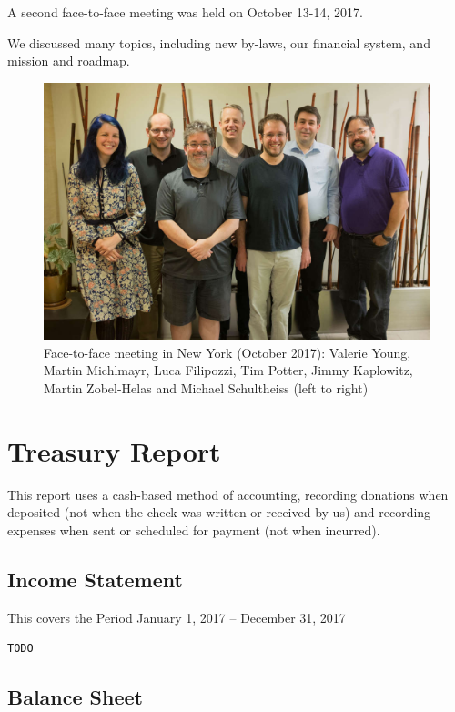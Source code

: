 \documentclass[a4paper]{report}
\begin{document}
A second face-to-face meeting was held on October 13-14, 2017.

We discussed many topics, including new by-laws, our financial system,
and mission and roadmap.

\begin{figure}[h]
\centering

\includegraphics[scale=1.00]{images/2017-october-f2f}

\caption{Face-to-face meeting in New York (October 2017): Valerie Young,
Martin Michlmayr, Luca Filipozzi, Tim Potter, Jimmy Kaplowitz, Martin
Zobel-Helas and Michael Schultheiss (left to right)}

\end{figure}

\chapter{Treasury Report}

This report uses a cash-based method of accounting, recording donations when
deposited (not when the check was written or received by us) and recording
expenses when sent or scheduled for payment (not when incurred).

\section{Income Statement}

This covers the Period January 1, 2017 -- December 31, 2017

\begin{verbatim}
TODO
\end{verbatim}

\section{Balance Sheet}
\end{document}
